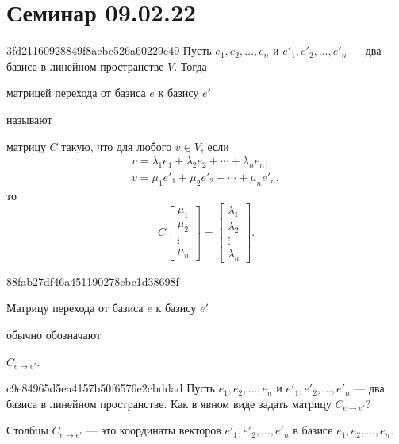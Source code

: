\section{Семинар 09.02.22}
\begin{note}{3fd21160928849f8acbc526a60229e49}
    Пусть \( e_1, e_2, \ldots, e_n \) и \( e'_1, e'_2, \ldots, e'_n \) --- два базиса в линейном пространстве \( V \).
    Тогда \begin{icloze}{2}матрицей перехода от базиса \( e \) к базису \( e' \)\end{icloze} называют
    \begin{icloze}{1}матрицу \( C \) такую, что для любого \( v \in V \), если
    \[
        \begin{gathered}
            v = \lambda_1 e_1 + \lambda_2 e_2 + \cdots + \lambda_n e_n, \\
            v = \mu_1 e'_1 + \mu_2 e'_2 + \cdots + \mu_n e'_n,
        \end{gathered}
    \]
    то
    \[
        C \begin{bmatrix}
            \mu_1 \\ \mu_2 \\ \vdots \\ \mu_n
        \end{bmatrix}
        =
        \begin{bmatrix}
            \lambda_1 \\ \lambda_2 \\ \vdots \\ \lambda_n
        \end{bmatrix}.
    \]
\end{icloze}
\end{note}

\begin{note}{88fab27df46a451190278cbc1d38698f}
    \begin{icloze}{2}Матрицу перехода от базиса \( e \) к базису \( e' \)\end{icloze} обычно обозначают \begin{icloze}{1}\( C_{e \to e'}  \).\end{icloze}
\end{note}

\begin{note}{c9e84965d5ea4157b50f6576e2cbddad}
    Пусть \( e_1, e_2, \ldots, e_n \) и \( e'_1, e'_2, \ldots, e'_n \) --- два базиса в линейном пространстве.
    Как в явном виде задать матрицу \( C_{e \to e'} \)?

    \begin{cloze}{1}
        Столбцы \( C_{e \to e'} \) --- это координаты векторов \( e'_1, e'_2, \ldots, e'_n \) в базисе \( e_1, e_2, \ldots, e_n \).
    \end{cloze}
\end{note}

